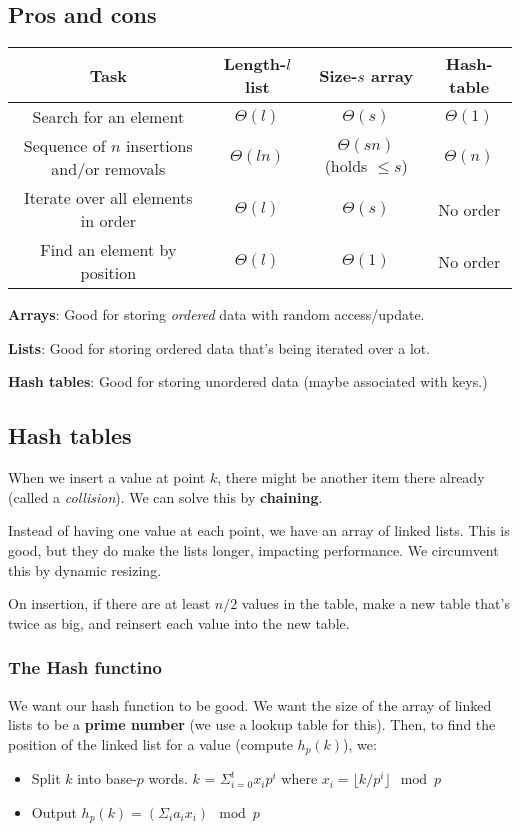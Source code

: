 \documentclass[11pt,fleqn,a4paper,titlepage,dvipsnames,cmyk]{scrartcl}
\begin{document}
\subsection{Pros and cons}%
\label{sub:Pros and cons}
\begin{center}
    \begin{tabular}{c|c|c|c}
        Task & Length-$l$ list & Size-$s$ array & Hash-table \\ \hline
        Search for an element & $\Theta(l)$ & $\Theta(s)$ & $\Theta(1)$ \\ \hline
        Sequence of $n$ insertions and/or removals & $\Theta(ln)$ &
        $\Theta(sn)$ (holds $\le s$) & $\Theta(n)$ \\ \hline
        Iterate over all elements in order & $\Theta(l)$ & $\Theta(s)$ &
        No order \\ \hline
        Find an element by position & $\Theta(l)$ & $\Theta(1)$ & No
        order \\ \hline
    \end{tabular}
\end{center}
\textbf{Arrays}: Good for storing \textit{ordered} data with random
access/update.

\textbf{Lists}: Good for storing ordered data that's being iterated over a
lot.

\textbf{Hash tables}: Good for storing unordered data (maybe associated
with keys.)

\subsection{Hash tables}%
\label{sub:Hash tables}
When we insert a value at point $k$, there might be another item there
already (called a \textit{collision}). We can solve this by
\textbf{chaining}.

Instead of having one value at each point, we have an array of linked
lists. This is good, but they do make the lists longer, impacting
performance. We circumvent this by dynamic resizing.

On insertion, if there are at least $n/2$ values in the table, make a new
table that's twice as big, and reinsert each value into the new table.

\subsubsection{The Hash functino}%
\label{ssub:The Hash functino}
We want our hash function to be good. We want the size of the array of
linked lists to be a \textbf{prime number} (we use a lookup table for
this). Then, to find the position of the linked list for a value (compute
$h_p(k)$), we:
\begin{itemize}
    \item Split $k$ into base-$p$ words. $k$ = $\Sigma_{i=0}^{t}x_ip^i$
        where $x_i = \lfloor k/p^i\rfloor \mod p$
    \item Output $h_p(k) = (\Sigma_i a_ix_i) \mod p$
\end{itemize}
\end{document}
